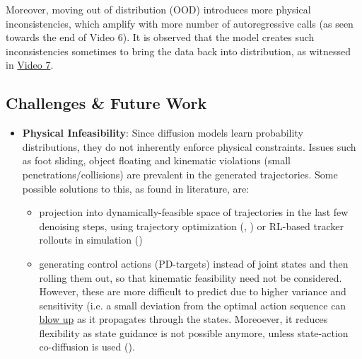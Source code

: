 Moreover, moving out of distribution (OOD) introduces more physical inconsistencies, which amplify with more number of autoregressive calls (as seen towards the end of Video 6). It is observed that the model creates such inconsistencies sometimes to bring the data back into distribution, as witnessed in \href{https://drive.google.com/file/d/1RDNRpqFFUyncRPiDelCEhSQJM5hSpoUY/view?usp=drive_link}{Video 7}.

\subsection{Challenges \& Future Work}\label{challenges-current-limitations-results-i}

\begin{itemize}

\item \textbf{Physical Infeasibility}\label{physical-infeasibility}:
Since diffusion models learn probability distributions, they do not
inherently enforce physical constraints. Issues such as foot sliding, object floating
and kinematic violations (small penetrations/collisions) are prevalent in the generated trajectories.
Some possible solutions to this, as found in literature, are:
\begin{itemize}
    \item projection into dynamically-feasible space of trajectories in the last few denoising steps, using trajectory optimization (\cite{römer2025diffusionpredictivecontrolconstraints}, \cite{bouvier2025ddatdiffusionpoliciesenforcing}) or RL-based tracker rollouts in simulation (\cite{tevet2024closdclosingloopsimulation})
    \item generating control actions (PD-targets) instead of joint states and then rolling them out, so that kinematic feasibility need not be considered. However, these are more difficult to predict due to higher variance and sensitivity (i.e. a small deviation from the optimal action sequence can \href{https://drive.google.com/file/d/1fwfYz5JiVRfQ1YmwkW9byez4yb4Wdfxv/view?usp=drive_link}{blow up} as it propagates through the states. Moreoever, it reduces flexibility as state guidance is not possible anymore, unless state-action co-diffusion is used (\cite{Huang_2025}).
\end{itemize}


\end{itemize}
